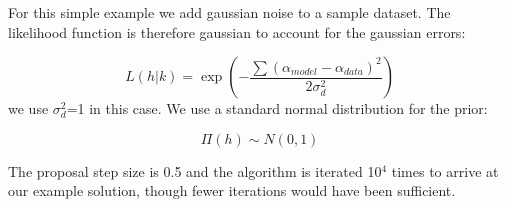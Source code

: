 For this simple example we add gaussian noise to a sample dataset. The likelihood function is therefore gaussian to account for the gaussian errors:

\begin{equation} \label{likely}
L\left(h|%
k\right)=\exp\left(- \frac{\sum({\alpha}_{model}-\alpha_{data})^2}{2\sigma_{d}^2}\right)
\end{equation} 
we use $\sigma_{d}^2$=1 in this case. We use a standard normal distribution for the prior:

\begin{equation}\label{prior_verify}
\Pi(h) \sim N(0,1)
\end{equation}

The proposal step size is 0.5 and the algorithm is iterated 10$^4$ times to arrive at our example solution, though fewer iterations would have been sufficient. 
















